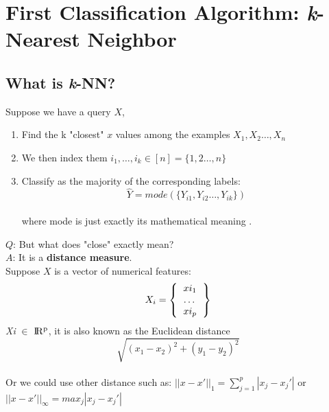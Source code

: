 \documentclass[a4paper]{article}
\begin{document}
\section{First Classification Algorithm: \textit{k}-Nearest Neighbor}

\subsection{What is \textit{k}-NN?} 

Suppose we have a query $X$, 
\begin{enumerate}
\item Find the k "closest" $x$ values among the examples $X_1, X_2 \ldots,X_n$
\item We then index them $i_1,\dots,i_k \in [n] = \{1,2 \dots, n\}$
\item Classify as the majority of the corresponding labels: 
\[\hat{Y} = mode(\{Y_{i1}, Y_{i2} \dots, Y_{ik}\})\] \\ where mode is just exactly its mathematical meaning .
\end{enumerate} $Q$: But what does "close" exactly mean? \\ $A$: It is a \textbf{distance measure}. \\ Suppose $X$ is a vector of numerical features: \[{X_i} = \left \{
  \begin{tabular}{ccc}
  $xi_1$ \\
  \dots \\
  $xi_p$
  \end{tabular}
\right \}\] 
\textit{Xi} $\in$  ${\rm I\!R^p}$, it is also known as  the Euclidean distance \[ \sqrt{(x_{1} - x_{2})^2 + (y_{1} - y_{2})^2} \]
\\ Or we could use other distance such as: 
$||x - x'||_1 = \sum_{j=1}^p|x_j - x_j'| $ or $||x - x'||_\infty = max_j|x_j - x_j'| $
\end{document}
